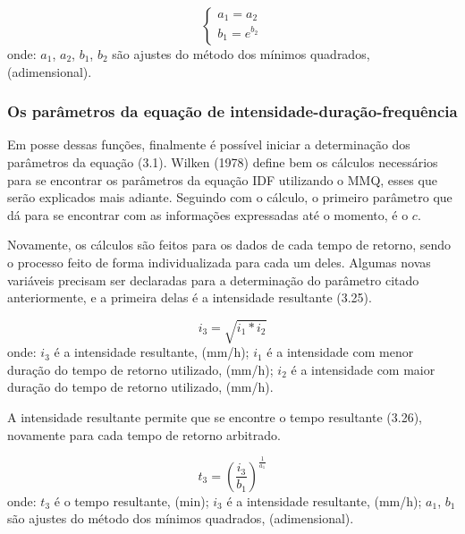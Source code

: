 \begin{equation}
\begin{cases}
a_1 = a_2 \\
b_1 = e^{b_2}
\end{cases}
\end{equation}
\newline
onde:
\newline
$a_1$, $a_2$, $b_1$, $b_2$ são ajustes do método dos mínimos quadrados, (adimensional).\bigskip

\subsubsection{Os parâmetros da equação de intensidade-duração-frequência}\bigskip

Em posse dessas funções, finalmente é possível iniciar a determinação dos parâmetros da equação (3.1). Wilken (1978) define bem os cálculos necessários para se encontrar os parâmetros da equação IDF utilizando o MMQ, esses que serão explicados mais adiante. Seguindo com o cálculo, o primeiro parâmetro que dá para se encontrar com as informações expressadas até o momento, é o $c$. 

Novamente, os cálculos são feitos para os dados de cada tempo de retorno, sendo o processo feito de forma individualizada para cada um deles. Algumas novas variáveis precisam ser declaradas para a determinação do parâmetro citado anteriormente, e a primeira delas é a intensidade resultante (3.25).\bigskip

\begin{equation}
i_3 = \sqrt{i_1 * i_2}
\end{equation}
\newline
onde:
\newline
\textit{$i_3$} é a intensidade resultante, (mm/h);
\newline
\textit{$i_1$} é a intensidade com menor duração do tempo de retorno utilizado, (mm/h);
\newline
\textit{$i_2$} é a intensidade com maior duração do tempo de retorno utilizado, (mm/h).\bigskip

A intensidade resultante permite que se encontre o tempo resultante (3.26), novamente para cada tempo de retorno arbitrado.\bigskip

\begin{equation}
t_3 = {\left(\frac{i_3}{b_1}\right)}^{\frac{1}{a_1}}
\end{equation}
\newline
\newline
onde:
\newline
$t_3$ é o tempo resultante, (min);
\newline
$i_3$ é a intensidade resultante, (mm/h);
\newline
$a_1$, $b_1$ são ajustes do método dos mínimos quadrados, (adimensional).\bigskip

